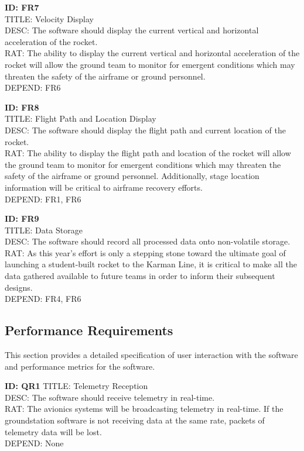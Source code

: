 \documentclass[onecolumn, draftclsnofoot,10pt, compsoc]{IEEEtran}
\begin{document}
			\noindent
			\textbf{ID: FR7}\\
			TITLE: Velocity Display\\
			DESC: The software should display the current vertical and horizontal acceleration of the rocket.\\
			RAT: The ability to display the current vertical and horizontal acceleration of the rocket will allow the ground team to monitor for emergent conditions which may threaten the safety of the airframe or ground personnel.\\
			DEPEND: FR6
			
			\noindent
			\textbf{ID: FR8}\\
			TITLE: Flight Path and Location Display\\
			DESC: The software should display the flight path and current location of the rocket.\\
			RAT: The ability to display the flight path and location of the rocket will allow the ground team to monitor for emergent conditions which may threaten the safety of the airframe or ground personnel.
				Additionally, stage location information will be critical to airframe recovery efforts.\\
			DEPEND: FR1, FR6
			
			\noindent
			\textbf{ID: FR9}\\
			TITLE: Data Storage\\
			DESC: The software should record all processed data onto non-volatile storage.\\
			RAT: As this year's effort is only a stepping stone toward the ultimate goal of launching a student-built rocket to the Karman Line, it is critical to make all the data gathered available to future teams in order to inform their subsequent designs.\\
			DEPEND: FR4, FR6
		
		\subsection{Performance Requirements}
			This section provides a detailed specification of user interaction with the software and performance metrics for the software.
		
			\noindent
			\textbf{ID: QR1}
			TITLE: Telemetry Reception\\
			DESC: The software should receive telemetry in real-time.\\
			RAT: The avionics systems will be broadcasting telemetry in real-time. 
				If the groundstation software is not receiving data at the same rate, packets of telemetry data will be lost.\\
			DEPEND: None
			
\end{document}

